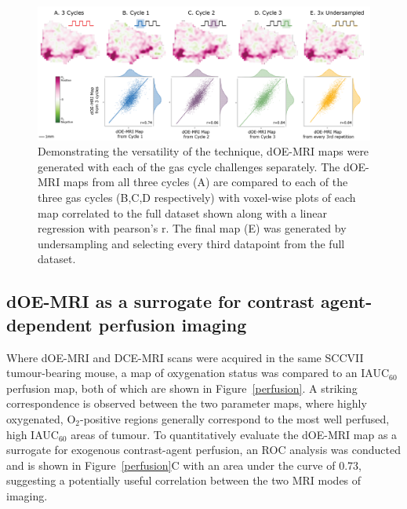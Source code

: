 \begin{figure}[htbp]
   \centering
   \includegraphics[width=\textwidth]{oemri/oemri-images/oemri_repeatability.png} %
   \caption{Demonstrating the versatility of the technique, dOE-MRI maps were generated with each of the gas cycle challenges separately.
The dOE-MRI maps from all three cycles (A) are compared to each of the three gas cycles (B,C,D respectively) with voxel-wise plots of each map correlated to the full dataset shown along with a linear regression with pearson's r.
The final map (E) was generated by undersampling and selecting every third datapoint from the full dataset.}
   \label{repeatability}
\end{figure}

\subsection{dOE-MRI as a surrogate for contrast agent-dependent perfusion imaging}

Where dOE-MRI and DCE-MRI scans were acquired in the same SCCVII tumour-bearing mouse, a map of oxygenation status was compared to an IAUC$_{60}$ perfusion map, both of which are shown in Figure~\ref{perfusion}.
A striking correspondence is observed between the two parameter maps, where highly oxygenated, O$_2$-positive regions generally correspond to the most well perfused, high IAUC$_{60}$ areas of tumour.
To quantitatively evaluate the dOE-MRI map as a surrogate for exogenous contrast-agent perfusion, an ROC analysis was conducted and is shown in Figure~\ref{perfusion}C with an area under the curve of 0.73, suggesting a potentially useful correlation between the two MRI modes of imaging.

